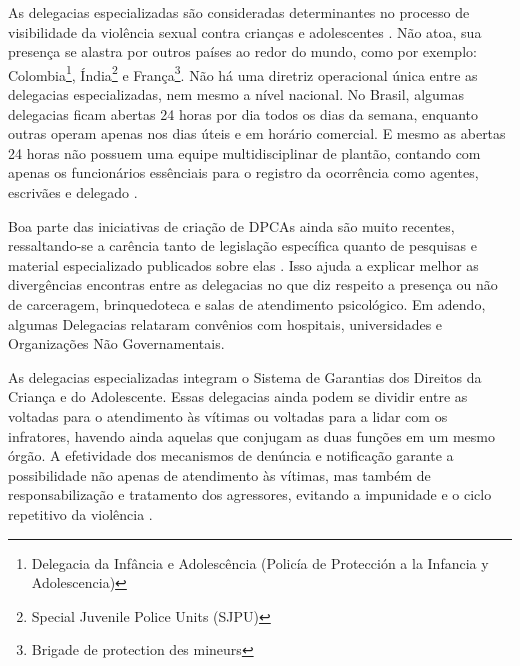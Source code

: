 As delegacias especializadas são consideradas determinantes no processo de visibilidade da violência sexual contra crianças e adolescentes \cite{plano2013}. Não atoa, sua presença se alastra por outros países ao redor do mundo, como por exemplo: Colombia\footnote{Delegacia da Infância e Adolescência (Policía de Protección a la Infancia y Adolescencia)}, Índia\footnote{Special Juvenile Police Units (SJPU)} e França\footnote{Brigade de protection des mineurs}.
Não há uma diretriz operacional única entre as delegacias especializadas, nem mesmo a nível nacional. No Brasil, algumas delegacias ficam abertas 24 horas por dia todos os dias da semana, enquanto outras operam apenas nos dias úteis e em horário comercial. E mesmo as abertas 24 horas não possuem uma equipe multidisciplinar de plantão, contando com apenas os funcionários essênciais para o registro da ocorrência como agentes, escrivães e delegado \cite{novo2016}. 

Boa parte das iniciativas de criação de DPCAs ainda são muito recentes, ressaltando-se a carência tanto de legislação específica quanto de pesquisas e material especializado publicados sobre elas \cite{novo2016}. Isso ajuda a explicar melhor as divergências encontras entre as delegacias no que diz respeito a presença ou não de carceragem, brinquedoteca e salas de atendimento psicológico. 
Em adendo, algumas Delegacias relataram convênios com hospitais, universidades e Organizações Não Governamentais.

As delegacias especializadas integram o Sistema de Garantias dos Direitos da Criança e do Adolescente. Essas delegacias ainda podem se dividir entre as voltadas para o atendimento às vítimas ou voltadas para a lidar com os infratores, havendo ainda aquelas que conjugam as duas funções em um mesmo órgão. A efetividade dos mecanismos de denúncia e notificação garante a possibilidade não apenas de atendimento às vítimas, mas também de responsabilização e tratamento dos agressores, evitando a impunidade e o ciclo repetitivo da violência \cite{novo2016}.


